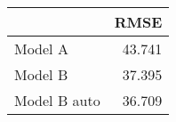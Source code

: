 
\begin{tabular}{l|r}
\hline
  & RMSE\\
\hline
Model A & 43.741\\
\hline
Model B & 37.395\\
\hline
Model B auto & 36.709\\
\hline
\end{tabular}
